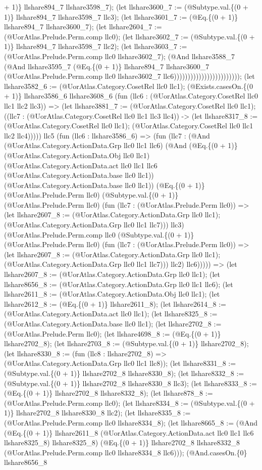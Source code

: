 \documentclass[11pt]{article}
\begin{document}
+ 1)\} llshare894\_7 llshare3598\_7); (let llshare3600\_7 := (@Subtype.val.\{(0 + 1)\} llshare894\_7 llshare3598\_7 llc3); (let llshare3601\_7 := (@Eq.\{(0 + 1)\} llshare894\_7 llshare3600\_7); (let llshare2604\_7 := (@UorAtlas.Prelude.Perm.comp llc0); (let llshare3602\_7 := (@Subtype.val.\{(0 + 1)\} llshare894\_7 llshare3598\_7 llc2); (let llshare3603\_7 := (@UorAtlas.Prelude.Perm.comp llc0 llshare3602\_7); (@And llshare3588\_7 (@And llshare3595\_7 (@Eq.\{(0 + 1)\} llshare894\_7 llshare3600\_7 (@UorAtlas.Prelude.Perm.comp llc0 llshare3602\_7 llc6)))))))))))))))))))))))); (let llshare3582\_6 := (@UorAtlas.Category.CosetRel llc0 llc1); (@Exists.casesOn.\{(0 + 1)\} llshare3586\_6 llshare3608\_6 (fun (llc6 : (@UorAtlas.Category.CosetRel llc0 llc1 llc2 llc3)) => (let llshare3881\_7 := (@UorAtlas.Category.CosetRel llc0 llc1); ((llc7 : (@UorAtlas.Category.CosetRel llc0 llc1 llc3 llc4)) -> (let llshare8317\_8 := (@UorAtlas.Category.CosetRel llc0 llc1); (@UorAtlas.Category.CosetRel llc0 llc1 llc2 llc4))))) llc5 (fun (llc6 : llshare3586\_6) => (fun (llc7 : (@And (@UorAtlas.Category.ActionData.Grp llc0 llc1 llc6) (@And (@Eq.\{(0 + 1)\} (@UorAtlas.Category.ActionData.Obj llc0 llc1) (@UorAtlas.Category.ActionData.act llc0 llc1 llc6 (@UorAtlas.Category.ActionData.base llc0 llc1)) (@UorAtlas.Category.ActionData.base llc0 llc1)) (@Eq.\{(0 + 1)\} (@UorAtlas.Prelude.Perm llc0) (@Subtype.val.\{(0 + 1)\} (@UorAtlas.Prelude.Perm llc0) (fun (llc7 : (@UorAtlas.Prelude.Perm llc0)) => (let llshare2607\_8 := (@UorAtlas.Category.ActionData.Grp llc0 llc1); (@UorAtlas.Category.ActionData.Grp llc0 llc1 llc7))) llc3) (@UorAtlas.Prelude.Perm.comp llc0 (@Subtype.val.\{(0 + 1)\} (@UorAtlas.Prelude.Perm llc0) (fun (llc7 : (@UorAtlas.Prelude.Perm llc0)) => (let llshare2607\_8 := (@UorAtlas.Category.ActionData.Grp llc0 llc1); (@UorAtlas.Category.ActionData.Grp llc0 llc1 llc7))) llc2) llc6))))) => (let llshare2607\_8 := (@UorAtlas.Category.ActionData.Grp llc0 llc1); (let llshare8656\_8 := (@UorAtlas.Category.ActionData.Grp llc0 llc1 llc6); (let llshare2611\_8 := (@UorAtlas.Category.ActionData.Obj llc0 llc1); (let llshare2612\_8 := (@Eq.\{(0 + 1)\} llshare2611\_8); (let llshare2614\_8 := (@UorAtlas.Category.ActionData.act llc0 llc1); (let llshare8325\_8 := (@UorAtlas.Category.ActionData.base llc0 llc1); (let llshare2702\_8 := (@UorAtlas.Prelude.Perm llc0); (let llshare4698\_8 := (@Eq.\{(0 + 1)\} llshare2702\_8); (let llshare2703\_8 := (@Subtype.val.\{(0 + 1)\} llshare2702\_8); (let llshare8330\_8 := (fun (llc8 : llshare2702\_8) => (@UorAtlas.Category.ActionData.Grp llc0 llc1 llc8)); (let llshare8331\_8 := (@Subtype.val.\{(0 + 1)\} llshare2702\_8 llshare8330\_8); (let llshare8332\_8 := (@Subtype.val.\{(0 + 1)\} llshare2702\_8 llshare8330\_8 llc3); (let llshare8333\_8 := (@Eq.\{(0 + 1)\} llshare2702\_8 llshare8332\_8); (let llshare878\_8 := (@UorAtlas.Prelude.Perm.comp llc0); (let llshare8334\_8 := (@Subtype.val.\{(0 + 1)\} llshare2702\_8 llshare8330\_8 llc2); (let llshare8335\_8 := (@UorAtlas.Prelude.Perm.comp llc0 llshare8334\_8); (let llshare8665\_8 := (@And (@Eq.\{(0 + 1)\} llshare2611\_8 (@UorAtlas.Category.ActionData.act llc0 llc1 llc6 llshare8325\_8) llshare8325\_8) (@Eq.\{(0 + 1)\} llshare2702\_8 llshare8332\_8 (@UorAtlas.Prelude.Perm.comp llc0 llshare8334\_8 llc6))); (@And.casesOn.\{0\} llshare8656\_8 
\end{document}
